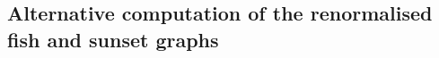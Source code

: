 \documentclass[10pt]{book}
\newcommand{\pp}{\mathsf{pp}}
\newcommand{\ms}{\mathsf{ms}}
\theoremstyle{break}
\begin{document}
%
%


\subsection{Alternative computation of the renormalised fish and sunset graphs}
\end{document}
